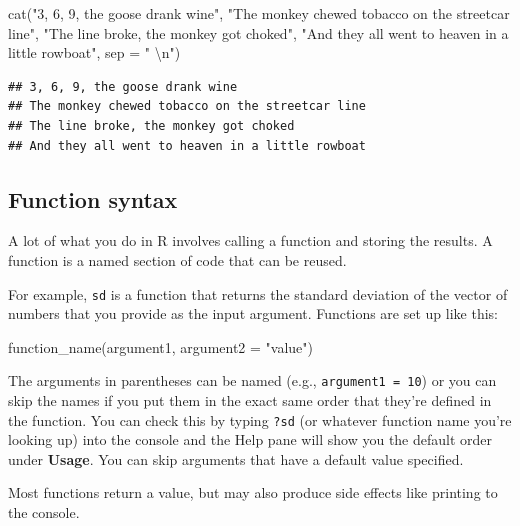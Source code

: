 \documentclass[
  oneside]{book}
\newenvironment{Shaded}{\begin{snugshade}}{\end{snugshade}}
\newcommand{\AttributeTok}[1]{\textcolor[rgb]{0.77,0.63,0.00}{#1}}
\newcommand{\FunctionTok}[1]{\textcolor[rgb]{0.00,0.00,0.00}{#1}}
\newcommand{\NormalTok}[1]{#1}
\newcommand{\SpecialCharTok}[1]{\textcolor[rgb]{0.00,0.00,0.00}{#1}}
\newcommand{\StringTok}[1]{\textcolor[rgb]{0.31,0.60,0.02}{#1}}
\begin{document}
\begin{Shaded}
\begin{Highlighting}[]
\FunctionTok{cat}\NormalTok{(}\StringTok{"3, 6, 9, the goose drank wine"}\NormalTok{,}
    \StringTok{"The monkey chewed tobacco on the streetcar line"}\NormalTok{,}
    \StringTok{"The line broke, the monkey got choked"}\NormalTok{,}
    \StringTok{"And they all went to heaven in a little rowboat"}\NormalTok{,}
    \AttributeTok{sep =} \StringTok{"  }\SpecialCharTok{\textbackslash{}n}\StringTok{"}\NormalTok{)}
\end{Highlighting}
\end{Shaded}

\begin{verbatim}
## 3, 6, 9, the goose drank wine  
## The monkey chewed tobacco on the streetcar line  
## The line broke, the monkey got choked  
## And they all went to heaven in a little rowboat
\end{verbatim}

\hypertarget{function_syx}{%
\subsection{Function syntax}\label{function_syx}}

A lot of what you do in R involves calling a function and storing the results. A function is a named section of code that can be reused.

For example, \texttt{sd} is a function that returns the standard deviation of the vector of numbers that you provide as the input argument. Functions are set up like this:

\begin{Shaded}
\begin{Highlighting}[]
\FunctionTok{function\_name}\NormalTok{(argument1, }\AttributeTok{argument2 =} \StringTok{"value"}\NormalTok{)}
\end{Highlighting}
\end{Shaded}

The arguments in parentheses can be named (e.g., \texttt{argument1\ =\ 10}) or you can skip the names if you put them in the exact same order that they're defined in the function. You can check this by typing \texttt{?sd} (or whatever function name you're looking up) into the console and the Help pane will show you the default order under \textbf{Usage}. You can skip arguments that have a default value specified.

Most functions return a value, but may also produce side effects like printing to the console.
\end{document}
